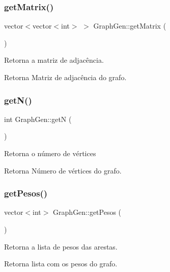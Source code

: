 \subsubsection{\texorpdfstring{get\+Matrix()}{getMatrix()}}
{\footnotesize\ttfamily vector$<$vector$<$int$>$ $>$ Graph\+Gen\+::get\+Matrix (\begin{DoxyParamCaption}{ }\end{DoxyParamCaption})}

Retorna a matriz de adjacência. \begin{DoxyReturn}{Retorna}
Matriz de adjacência do grafo. 
\end{DoxyReturn}
\mbox{\label{classGraphGen_a7447dc2fdc4cd3f86579811febfff1ad}} 
\subsubsection{\texorpdfstring{get\+N()}{getN()}}
{\footnotesize\ttfamily int Graph\+Gen\+::getN (\begin{DoxyParamCaption}{ }\end{DoxyParamCaption})}

Retorna o número de vértices \begin{DoxyReturn}{Retorna}
Número de vértices do grafo. 
\end{DoxyReturn}
\mbox{\label{classGraphGen_a56cb589bfd48135fe224d172dbed3155}} 
\subsubsection{\texorpdfstring{get\+Pesos()}{getPesos()}}
{\footnotesize\ttfamily vector$<$int$>$ Graph\+Gen\+::get\+Pesos (\begin{DoxyParamCaption}{ }\end{DoxyParamCaption})}

Retorna a lista de pesos das arestas. \begin{DoxyReturn}{Retorna}
lista com os pesos do grafo. 
\end{DoxyReturn}
\mbox{\label{classGraphGen_ab37943d4526c45711622796c84e983ac}} 
